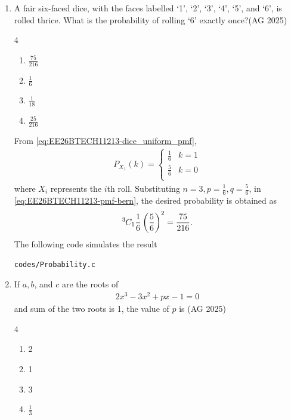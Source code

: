 \begin{enumerate}[label=\thesubsection.\arabic*,ref=\thesubsection.\theenumi]
%
 \item A fair six-faced dice, with the faces labelled ‘1’, ‘2’, ‘3’, ‘4’, ‘5’, and ‘6’, is rolled
    thrice. What is the probability of rolling ‘6’ exactly once?\hfill(AG 2025)
	\begin{multicols}{4}
 \begin{enumerate}
    \item $\frac{75}{216}$
    \item $\frac{1}{6}$
    \item $\frac{1}{18}$
    \item $\frac{25}{216}$
\end{enumerate}
\end{multicols}
\solution
From \eqref{eq:EE26BTECH11213-dice_uniform_pmf},
        \begin{align}
            P_{X_1}(k)=
                \begin{cases}
                    \frac{1}{6} &  k=1 \\
                    \frac{5}{6} & k=0\\
                \end{cases}
        \end{align}
       where $X_i$ represents the $i$th roll. 
Substituting $n=3,
p=\frac{1}{6}, 
q=\frac{5}{6}$,
in \eqref{eq:EE26BTECH11213-pmf-bern},
the desired probability is obtained as
    \begin{align}
	    {{}^{3}\mkern-1muC_{1}}\frac{1}{6}\left(\frac{5}{6}\right)^2
        =\frac{75}{216}.
    \end{align}
The following code simulates the result 
\begin{lstlisting}
codes/Probability.c
\end{lstlisting}
%
	\item If $a, b$, and $c$ are the roots of 
    \begin{align}
		2x^3 - 3x^2 + px - 1=0
       \label{eq:absum-root}
	\end{align}
		and sum of the two roots is 1, the value of $p$ is \hfill(AG 2025)
	\begin{multicols}{4}
\begin{enumerate}
    \item 2
    \item 1
    \item 3
    \item $\frac{1}{3}$
\end{enumerate}
\end{multicols}

\end{enumerate}

